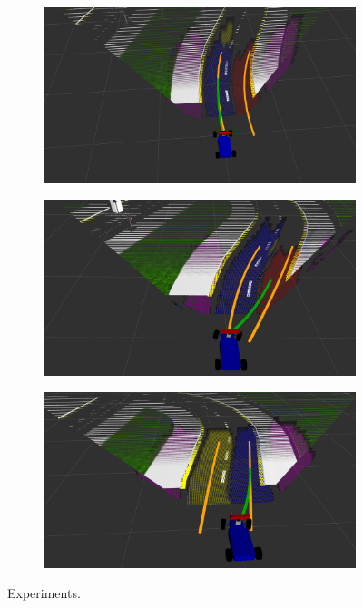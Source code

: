 \begin{figure}[h]
\begin{subfigure}[b]{0.45\linewidth}
  \end{subfigure}
  \begin{subfigure}[b]{0.45\linewidth}
      \includegraphics[width=\linewidth]{figures/experiments/overtaking2-pc.png}
  \end{subfigure}
  \begin{subfigure}[b]{0.45\linewidth}
      \includegraphics[width=\linewidth]{figures/experiments/overtaking3-pc.png}
  \end{subfigure}
  \begin{subfigure}[b]{0.45\linewidth}
      \includegraphics[width=\linewidth]{figures/experiments/overtaking4-pc.png}
  \end{subfigure}
  \caption{Experiments.}
  \label{figure:lane-change}
\end{figure}


